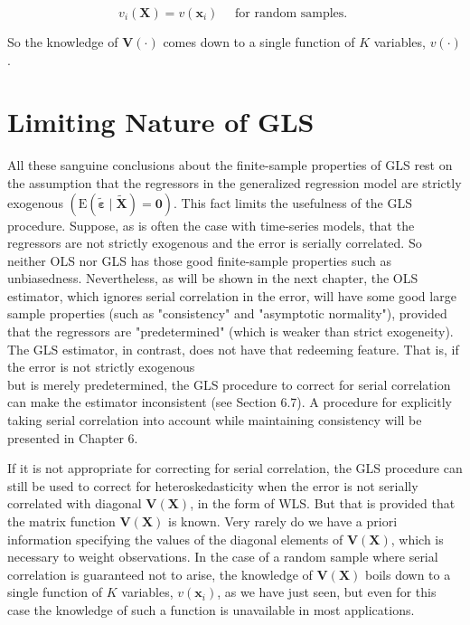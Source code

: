 \documentclass[10pt]{article}
\begin{document}
\begin{equation*}
v_{i}(\mathbf{X})=v\left(\mathbf{x}_{i}\right) \quad \text { for random samples. } \tag{1.6.7}
\end{equation*}


So the knowledge of $\mathbf{V}(\cdot)$ comes down to a single function of $K$ variables, $v(\cdot)$.

\section*{Limiting Nature of GLS}
All these sanguine conclusions about the finite-sample properties of GLS rest on the assumption that the regressors in the generalized regression model are strictly exogenous $(\mathrm{E}(\tilde{\boldsymbol{\varepsilon}} \mid \tilde{\mathbf{X}})=\mathbf{0})$. This fact limits the usefulness of the GLS procedure. Suppose, as is often the case with time-series models, that the regressors are not strictly exogenous and the error is serially correlated. So neither OLS nor GLS has those good finite-sample properties such as unbiasedness. Nevertheless, as will be shown in the next chapter, the OLS estimator, which ignores serial correlation in the error, will have some good large sample properties (such as "consistency" and "asymptotic normality"), provided that the regressors are "predetermined" (which is weaker than strict exogeneity). The GLS estimator, in contrast, does not have that redeeming feature. That is, if the error is not strictly exogenous\\
but is merely predetermined, the GLS procedure to correct for serial correlation can make the estimator inconsistent (see Section 6.7). A procedure for explicitly taking serial correlation into account while maintaining consistency will be presented in Chapter 6.

If it is not appropriate for correcting for serial correlation, the GLS procedure can still be used to correct for heteroskedasticity when the error is not serially correlated with diagonal $\mathbf{V}(\mathbf{X})$, in the form of WLS. But that is provided that the matrix function $\mathbf{V}(\mathbf{X})$ is known. Very rarely do we have a priori information specifying the values of the diagonal elements of $\mathbf{V}(\mathbf{X})$, which is necessary to weight observations. In the case of a random sample where serial correlation is guaranteed not to arise, the knowledge of $\mathbf{V}(\mathbf{X})$ boils down to a single function of $K$ variables, $v\left(\mathbf{x}_{i}\right)$, as we have just seen, but even for this case the knowledge of such a function is unavailable in most applications.
\end{document}
